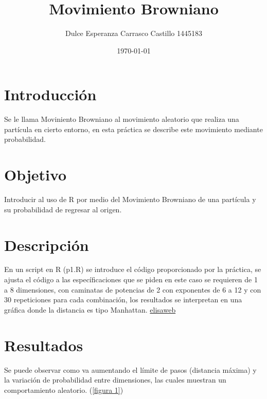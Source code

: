 \documentclass{article}
\author{Dulce Esperanza Carrasco Castillo 1445183}
\title{Movimiento Browniano}
\date{\today}
\begin{document}
\maketitle


\section{Introducción}

Se le llama Moviniento Browniano al movimiento aleatorio que realiza una partícula en cierto entorno, en esta práctica se describe este movimiento mediante probabilidad. 

\section{Objetivo}
Introducir al uso de R por medio del Movimiento Browniano de una partícula y su probabilidad de regresar al origen.

\section{Descripción}
En un script en R (p1.R) se introduce el código proporcionado por la práctica, se ajusta el código a las específicaciones que se piden en este caso se requieren de 1 a 8 dimensiones, con caminatas de potencias de 2 con exponentes de 6 a 12 y con 30 repeticiones para cada combinación, los resultados se interpretan en una gráfica donde la distancia es tipo Manhattan. \url{elisaweb}

\section{Resultados}

Se puede observar como va aumentando el límite de pasos (distancia máxima) y la variación de probabilidad entre dimensiones, las cuales muestran un comportamiento aleatorio. (\ref{figura 1})
\end{document}
